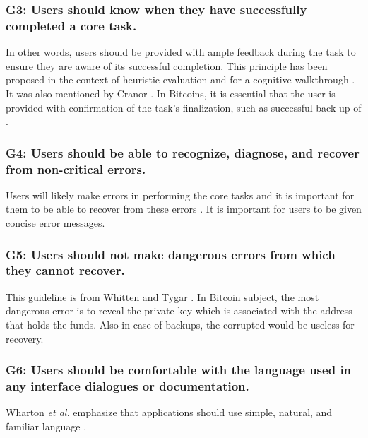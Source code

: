 \subsubsection*{G3: Users should know when they have successfully completed a core task.} In other words, users should be provided with ample feedback during the task to ensure they are aware of its successful completion. This principle has been proposed in the context of heuristic evaluation \cite{cw} and for a cognitive walkthrough \cite{pvo}. It was also mentioned by Cranor \cite{p3p}. In Bitcoins, it is essential that the user is provided with confirmation of the task's finalization, such as successful back up of \walletfile.

\subsubsection*{G4: Users should be able to recognize, diagnose, and recover from non-critical errors.} Users will likely make errors in performing the core tasks and it is important for them to be able to recover from these errors \cite{cw}. It is important for users to be given concise error messages.

\subsubsection*{G5: Users should not make dangerous errors from which they cannot recover.} This guideline is from Whitten and Tygar \cite{johnny}. In Bitcoin subject, the most dangerous error is to reveal the private key which is associated with the address that holds the funds. Also in case of backups, the corrupted \walletfile would be useless for recovery.

\subsubsection*{G6: Users should be comfortable with the language used in any interface dialogues or documentation.} Wharton \textit{et al.} emphasize that applications should use simple, natural, and familiar language \cite{cw}. 


